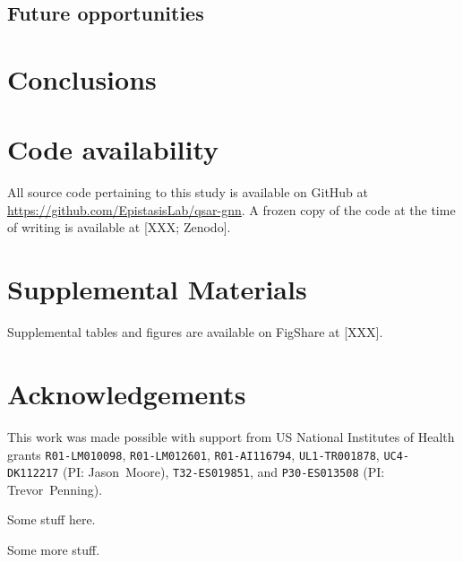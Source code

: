 \documentclass{ws-procs11x85}
\begin{document}
\subsection{Future opportunities}

\section{Conclusions}

\section{Code availability}
All source code pertaining to this study is available on GitHub at \url{https://github.com/EpistasisLab/qsar-gnn}.
A frozen copy of the code at the time of writing is available at [XXX; Zenodo].

\section{Supplemental Materials}
Supplemental tables and figures are available on FigShare at [XXX].

\section*{Acknowledgements}
This work was made possible with support from US National Institutes of Health grants \texttt{R01-LM010098}, \texttt{R01-LM012601}, \texttt{R01-AI116794}, \texttt{UL1-TR001878}, \texttt{UC4-DK112217} (PI: Jason~Moore), \texttt{T32-ES019851}, and \texttt{P30-ES013508} (PI: Trevor~Penning).

\label{GCNN}
Some stuff here.

\label{NC}
Some more stuff.



\end{document}
